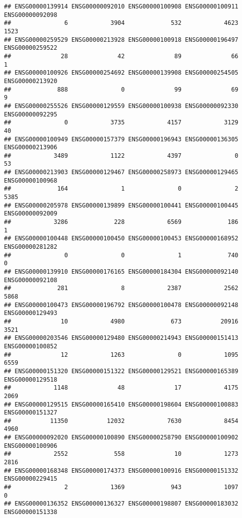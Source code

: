\documentclass[
]{article}
\begin{document}
\begin{verbatim}
## ENSG00000139914 ENSG00000092010 ENSG00000100908 ENSG00000100911 ENSG00000092098 
##               6            3904             532            4623            1523 
## ENSG00000259529 ENSG00000213928 ENSG00000100918 ENSG00000196497 ENSG00000259522 
##              28              42              89              66               1 
## ENSG00000100926 ENSG00000254692 ENSG00000139908 ENSG00000254505 ENSG00000213920 
##             888               0              99              69               9 
## ENSG00000255526 ENSG00000129559 ENSG00000100938 ENSG00000092330 ENSG00000092295 
##               0            3735            4157            3129              40 
## ENSG00000100949 ENSG00000157379 ENSG00000196943 ENSG00000136305 ENSG00000213906 
##            3489            1122            4397               0              53 
## ENSG00000213903 ENSG00000129467 ENSG00000258973 ENSG00000129465 ENSG00000100968 
##             164               1               0               2            5385 
## ENSG00000205978 ENSG00000139899 ENSG00000100441 ENSG00000100445 ENSG00000092009 
##            3286             228            6569             186               1 
## ENSG00000100448 ENSG00000100450 ENSG00000100453 ENSG00000168952 ENSG00000281282 
##               0               0               1             740               0 
## ENSG00000139910 ENSG00000176165 ENSG00000184304 ENSG00000092140 ENSG00000092108 
##             281               8            2387            2562            5868 
## ENSG00000100473 ENSG00000196792 ENSG00000100478 ENSG00000092148 ENSG00000129493 
##              10            4980             673           20916            3521 
## ENSG00000203546 ENSG00000129480 ENSG00000214943 ENSG00000151413 ENSG00000100852 
##              12            1263               0            1095            6559 
## ENSG00000151320 ENSG00000151322 ENSG00000129521 ENSG00000165389 ENSG00000129518 
##            1148              48              17            4175            2069 
## ENSG00000129515 ENSG00000165410 ENSG00000198604 ENSG00000100883 ENSG00000151327 
##           11350           12032            7630            8454            4960 
## ENSG00000092020 ENSG00000100890 ENSG00000258790 ENSG00000100902 ENSG00000100906 
##            2552             558              10            1273            2816 
## ENSG00000168348 ENSG00000174373 ENSG00000100916 ENSG00000151332 ENSG00000229415 
##               2            1369             943            1097               0 
## ENSG00000136352 ENSG00000136327 ENSG00000198807 ENSG00000183032 ENSG00000151338 

\end{verbatim}
\end{document}
